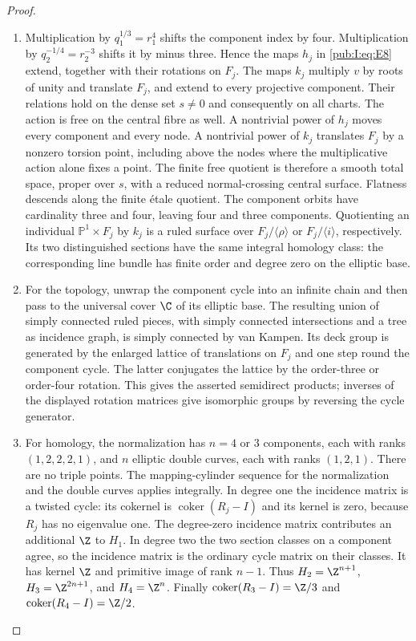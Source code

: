 \begin{proof}
\begin{enumerate}[label=\arabic*.,leftmargin=*]
\item Multiplication by $q_1^{1/3}=r_1^4$ shifts the component index by four.
Multiplication by $q_2^{-1/4}=r_2^{-3}$ shifts it by minus three.
Hence the maps $h_j$ in \eqref{pub:I:eq:E8} extend, together with their rotations
on $F_j$. The maps $k_j$ multiply $v$ by roots of unity and translate
$F_j$, and extend to every projective component. Their relations
hold on the dense set $s\ne0$ and consequently on all charts.
The action is free on the central fibre as well. A nontrivial power
of $h_j$ moves every component and every node. A nontrivial power
of $k_j$ translates $F_j$ by a nonzero torsion point, including
above the nodes where the multiplicative action alone fixes a point.
The finite free quotient is therefore a smooth total space, proper
over $s$, with a reduced normal-crossing central surface. Flatness
descends along the finite \'etale quotient. The component orbits have
cardinality three and four, leaving four and three components.
Quotienting an individual $\mathbb P^1\times F_j$ by $k_j$ is a
ruled surface over $F_j/\langle\rho\rangle$ or
$F_j/\langle i\rangle$, respectively. Its two distinguished
sections have the same integral homology class: the corresponding
line bundle has finite order and degree zero on the elliptic base.

\item For the topology, unwrap the component cycle into an infinite chain
and then pass to the universal cover $\C$ of its elliptic base.
The resulting union of simply connected ruled pieces, with
simply connected intersections and a tree as incidence graph, is
simply connected by van Kampen. Its deck group is generated by
the enlarged lattice of translations on $F_j$ and one step round
the component cycle. The latter conjugates the lattice by the
order-three or order-four rotation. This gives the asserted
semidirect products; inverses of the displayed rotation matrices
give isomorphic groups by reversing the cycle generator.

\item For homology, the normalization has $n=4$ or $3$ components, each
with ranks $(1,2,2,2,1)$, and $n$ elliptic double curves, each with
ranks $(1,2,1)$. There are no triple points. The mapping-cylinder
sequence for the normalization and the double curves applies
integrally. In degree one the incidence matrix is a twisted cycle:
its cokernel is $\operatorname{coker}(R_j-I)$ and its kernel is
zero, because $R_j$ has no eigenvalue one. The degree-zero incidence
matrix contributes an additional $\Z$ to $H_1$. In degree two the
two section classes on a component agree, so the incidence matrix
is the ordinary cycle matrix on their classes. It has kernel
$\Z$ and primitive image of rank $n-1$. Thus $H_2=\Z^{n+1}$,
$H_3=\Z^{2n+1}$, and $H_4=\Z^n$. Finally
$\operatorname{coker}(R_3-I)=\Z/3$ and
$\operatorname{coker}(R_4-I)=\Z/2$. 
\end{enumerate}
\end{proof}
